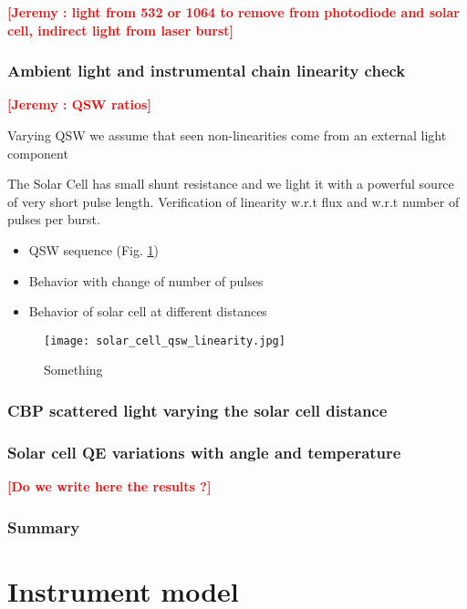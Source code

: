 \documentclass[onecolumn]{aa}
\newcommand{\todo}[1]{\textbf{\textcolor{red}{[#1]}}\xspace}
\begin{document}
\todo{Jeremy : light from 532 or 1064 to remove from photodiode and solar cell, indirect light from laser burst}

\subsubsection{Ambient light and instrumental chain linearity check}

\todo{Jeremy : QSW ratios}

Varying QSW we assume that seen non-linearities come from an external light component

The Solar Cell has small shunt resistance and we light it with a powerful source
of very short pulse length. Verification of linearity w.r.t flux and w.r.t
number of pulses per burst. 


\begin{itemize}
  \item QSW sequence  (Fig. \ref{fig:SCqswlinearity})
  \item Behavior with change of number of pulses
  \item Behavior of solar cell at different distances
\end{itemize}


\begin{figure}[!ht]
\begin{center}
\texttt{[image: solar\_cell\_qsw\_linearity.jpg]}
\end{center}
\caption[]{Something}
\label{fig:SCqswlinearity}
\end{figure}


\subsubsection{CBP scattered light varying the solar cell distance}


\subsubsection{Solar cell QE variations with angle and temperature}

\todo{Do we write here the results ?}


\subsubsection{Summary}


\section{Instrument model}\label{sec:model}
\end{document}

